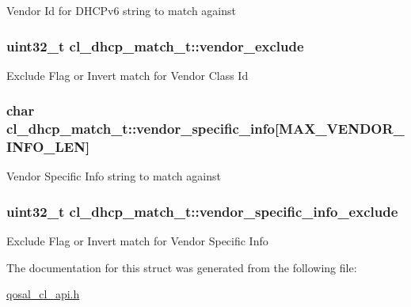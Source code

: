 Vendor Id for D\-H\-C\-Pv6 string to match against \hypertarget{structcl__dhcp__match__t_a4226ed14571461835822f97c2f0ea85c}{
\subsubsection[{vendor\-\_\-exclude}]{\setlength{\rightskip}{0pt plus 5cm}uint32\-\_\-t cl\-\_\-dhcp\-\_\-match\-\_\-t\-::vendor\-\_\-exclude}}\label{structcl__dhcp__match__t_a4226ed14571461835822f97c2f0ea85c}
Exclude Flag or Invert match for Vendor Class Id \hypertarget{structcl__dhcp__match__t_a2fcd52a023b1b4afee4ffbf806a361a5}{
\subsubsection[{vendor\-\_\-specific\-\_\-info}]{\setlength{\rightskip}{0pt plus 5cm}char cl\-\_\-dhcp\-\_\-match\-\_\-t\-::vendor\-\_\-specific\-\_\-info\mbox{[}{\bf M\-A\-X\-\_\-\-V\-E\-N\-D\-O\-R\-\_\-\-I\-N\-F\-O\-\_\-\-L\-E\-N}\mbox{]}}}\label{structcl__dhcp__match__t_a2fcd52a023b1b4afee4ffbf806a361a5}
Vendor Specific Info string to match against \hypertarget{structcl__dhcp__match__t_a7bf3b9316d154585b7748ac9502c52e2}{
\subsubsection[{vendor\-\_\-specific\-\_\-info\-\_\-exclude}]{\setlength{\rightskip}{0pt plus 5cm}uint32\-\_\-t cl\-\_\-dhcp\-\_\-match\-\_\-t\-::vendor\-\_\-specific\-\_\-info\-\_\-exclude}}\label{structcl__dhcp__match__t_a7bf3b9316d154585b7748ac9502c52e2}
Exclude Flag or Invert match for Vendor Specific Info 

The documentation for this struct was generated from the following file\-:\begin{DoxyCompactItemize}
\item 
\hyperlink{qosal__cl__api_8h}{qosal\-\_\-cl\-\_\-api.\-h}\end{DoxyCompactItemize}
